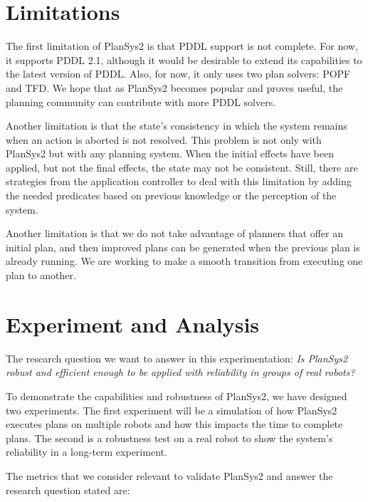 \documentclass[letterpaper, 10 pt, conference]{IEEEtran}
\begin{document}

\section{Limitations}
\label{sec:limitations}

The first limitation of PlanSys2 is that PDDL support is not complete. For now, it supports PDDL 2.1, although it would be desirable to extend its capabilities to the latest version of PDDL. Also, for now, it only uses two plan solvers: POPF and TFD.
We hope that as PlanSys2 becomes popular and proves useful, the planning community can contribute with more PDDL solvers.

Another limitation is that the state's consistency in which the system remains when an action is aborted is not resolved. This problem is not only with PlanSys2 but with any planning system. When the initial effects have been applied, but not the final effects, the state may not be consistent. Still, there are strategies from the application controller to deal with this limitation by adding the needed predicates based on previous knowledge or the perception of the system.

Another limitation is that we do not take advantage of planners that offer an initial plan, and then improved plans can be generated when the previous plan is already running. We are working to make a smooth transition from executing one plan to another.

\section{Experiment and Analysis}
\label{sec:experiments}

The research question we want to answer in this experimentation: \emph{Is PlanSys2 robust and efficient enough to be applied with reliability in groups of real robots?}

To demonstrate the capabilities and robustness of PlanSys2, we have designed two experiments. The first experiment will be a simulation of how PlanSys2 executes plans on multiple robots and how this impacts the time to complete plans. The second is a robustness test on a real robot to show the system's reliability in a long-term experiment.


The metrics that we consider relevant to validate PlanSys2 and answer the research question stated are:
\end{document}
